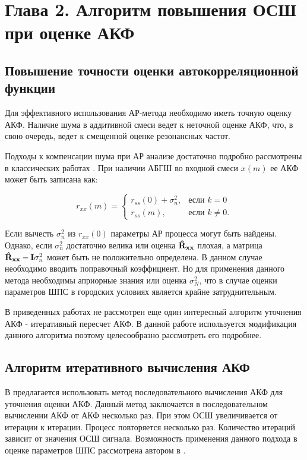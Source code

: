 \section{Глава 2. Алгоритм повышения ОСШ при оценке АКФ}

\subsection{Повышение точности оценки автокорреляционной функции}
Для эффективного использования АР-метода необходимо иметь точную оценку АКФ. Наличие шума в аддитивной смеси ведет к неточной
оценке АКФ, что, в свою очередь, ведет к смещенной оценке резонансных частот.

Подходы к компенсации шума при АР анализе достаточно подробно рассмотрены в классических работах \cite{kay_ar_book, kay_noise_compensation}.
При наличии АБГШ во входной смеси ${x(m)}$ ее АКФ может быть записана как:
\begin{center}
\begin{equation}
	\label{eq:acf_noise_basic}
	r_{xx}(m) =	\begin{cases}
				r_{ss}(0) + \sigma_n^2, & \mbox{если } k=0 \\
				r_{ss}(m), & \mbox{если } k \ne 0.
			\end{cases}
\end{equation}
\end{center}

Если вычесть ${\sigma_n^2}$ из ${r_{xx}(0)}$ параметры АР процесса могут быть найдены. Однако, если ${\sigma_n^2}$ достаточно велика или 
оценка ${{\bf{\hat{R}_{xx}}}}$ плохая, а матрица ${{\bf{\hat{R}_{xx}}} - {\bf{I}}\sigma_n^2}$ может быть не положительно определена. В данном
случае необходимо вводить поправочный коэффициент. Но для применения данного метода необходимы априорные знания или оценка ${\sigma_N^2}$,
что в случае оценки параметров ШПС в городских условиях является крайне затруднительным.

В приведенных работах не рассмотрен еще один интересный алгоритм уточнения АКФ - итеративный пересчет АКФ. В данной работе используется
модификация данного алгоритма поэтому целесообразно рассмотреть его подробнее.

\subsection{Алгоритм итеративного вычисления АКФ}
\label{sec_ostanin}
В \cite{ostanin_akf} предлагается использовать метод последовательного вычисления АКФ для уточнения оценки АКФ. Данный метод
заключается в последовательном вычислении АКФ от АКФ несколько раз. При этом ОСШ увеличивается от итерации к итерации.
Процесс повторяется несколько раз. Количество итераций зависит от значения ОСШ сигнала. Возможность применения данного подхода в оценке параметров ШПС рассмотрена
автором в \cite{my_acf_cdma}.


